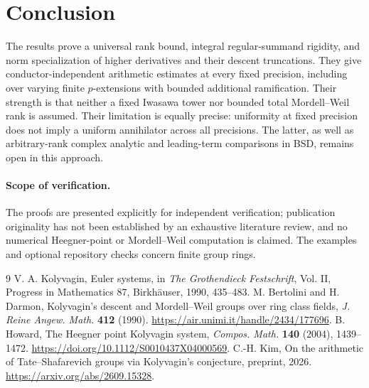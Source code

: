 \documentclass[11pt,a4paper]{article}
\theoremstyle{definition}
\theoremstyle{remark}
\begin{document}
\section{Conclusion}
The results prove a universal rank bound, integral regular-summand rigidity, and norm specialization of higher derivatives and their descent truncations. They give conductor-independent arithmetic estimates at every fixed precision, including over varying finite $p$-extensions with bounded additional ramification. Their strength is that neither a fixed Iwasawa tower nor bounded total Mordell--Weil rank is assumed. Their limitation is equally precise: uniformity at fixed precision does not imply a uniform annihilator across all precisions. The latter, as well as arbitrary-rank complex analytic and leading-term comparisons in BSD, remains open in this approach.

\paragraph{Scope of verification.} The proofs are presented explicitly for independent verification; publication originality has not been established by an exhaustive literature review, and no numerical Heegner-point or Mordell--Weil computation is claimed. The examples and optional repository checks concern finite group rings.

\begin{thebibliography}{9}
 V. A. Kolyvagin, Euler systems, in \emph{The Grothendieck Festschrift}, Vol. II, Progress in Mathematics 87, Birkh\"auser, 1990, 435--483.
 M. Bertolini and H. Darmon, Kolyvagin's descent and Mordell--Weil groups over ring class fields, \emph{J. Reine Angew. Math.} \textbf{412} (1990). \url{https://air.unimi.it/handle/2434/177696}.
 B. Howard, The Heegner point Kolyvagin system, \emph{Compos. Math.} \textbf{140} (2004), 1439--1472. \url{https://doi.org/10.1112/S0010437X04000569}.
 C.-H. Kim, On the arithmetic of Tate--Shafarevich groups via Kolyvagin's conjecture, preprint, 2026. \url{https://arxiv.org/abs/2609.15328}.
\end{thebibliography}
\end{document}
